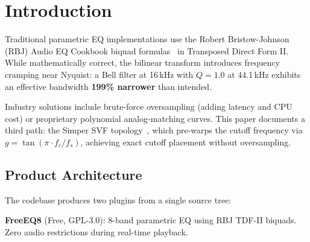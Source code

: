 \documentclass[twoside,a4paper]{article}
\title{\papertitle}
\affiliation
{\paperauthorA}
{Independent Researcher (GareBear99 / TizWildin) \\ 
\href{https://github.com/GareBear99/FreeEQ8}{https://github.com/GareBear99/FreeEQ8}\\
{\tt \href{mailto:neovectr.inc@gmail.com}{neovectr.inc@gmail.com}}
}
\newif\ifpdf
\begin{document}
\ifpdf
  \DeclareGraphicsExtensions{.png,.jpg,.pdf}
\else
\fi

\maketitle

\begin{abstract}
We present FreeEQ8/ProEQ8, an open-source parametric equalizer using the Simper State Variable Filter (SVF) topology for modulation-stable Dynamic EQ. Both SVF and RBJ use BLT with identical prewarping and produce identical steady-state responses; SVF chosen for lower automation noise, better coefficient interpolation, improved SNR near DC. The architecture features lock-free SPSC triple-buffering for real-time safety, a variable-cadence coefficient engine reducing Dynamic EQ CPU cost by 75\%, and allocation-free semantic resonance detection. Measured performance: 0.62\% single-core CPU at 44.1\,kHz (161$\times$ headroom). Source code, benchmarks, and CI validation available under GPL-3.0.
\end{abstract}

\section{Introduction}
\label{sec:intro}

Traditional parametric EQ implementations use the Robert Bristow-Johnson (RBJ) Audio EQ Cookbook biquad formulas~\cite{RBJ} in Transposed Direct Form II. While mathematically correct, the bilinear transform introduces frequency cramping near Nyquist: a Bell filter at 16\,kHz with $Q=1.0$ at 44.1\,kHz exhibits an effective bandwidth \textbf{199\% narrower} than intended.

Industry solutions include brute-force oversampling (adding latency and CPU cost) or proprietary polynomial analog-matching curves. This paper documents a third path: the Simper SVF topology~\cite{Simper2013}, which pre-warps the cutoff frequency via $g = \tan(\pi \cdot f_c / f_s)$, achieving exact cutoff placement without oversampling.

\subsection{Product Architecture}

The codebase produces two plugins from a single source tree:

\textbf{FreeEQ8} (Free, GPL-3.0): 8-band parametric EQ using RBJ TDF-II biquads. Zero audio restrictions during real-time playback.
\end{document}
